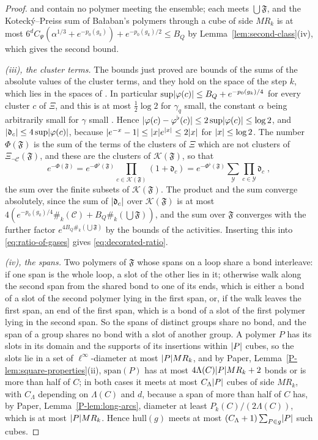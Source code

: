 \documentclass[11pt]{preprint}
\DeclarePairedDelimiter{\abs}{\lvert}{\rvert}
\numberwithin{equation}{section}
\theoremstyle{definition}
\theoremstyle{remark}
\theoremstyle{plain}
\begin{document}
\begin{proof}
and contain no polymer meeting the ensemble; each meets $\bigcup\mathfrak F$, and the Koteck\'y--Preiss sum of Ba{\l}aban's polymers through a cube of side $MR_k$ is at most $6^dC_\Psi(\alpha^{1/3} + e^{-p_0(g_k)}) + e^{-p_0(g_k)/2} \leq B_Q$ by Lemma~\ref{lem:second-class}(iv), which gives the second bound.

\emph{(iii), the cluster terms.} The bounds just proved are bounds of the sums of the absolute values of the cluster terms, and they hold on the space of the step $k$, which lies in the spaces of \cite[(1.73)--(1.75), p.~380]{BalabanLFR2}. In particular $\sup\abs{\varphi(c)} \leq B_Q + e^{-p_0(g_k)/4}$ for every cluster $c$ of $\Xi$, and this is at most $\frac12\log 2$ for $\gamma_q$ small, the constant $\alpha$ being arbitrarily small for $\gamma$ small \cite[p.~377]{BalabanLFR2}. Hence $\abs{\varphi(c) - \varphi^\flat(c)} \leq 2\sup\abs{\varphi(c)} \leq \log 2$, and $\abs{\mathfrak d_c} \leq 4\sup\abs{\varphi(c)}$, because $\abs{e^{-x} - 1} \leq \abs xe^{\abs x} \leq 2\abs x$ for $\abs x \leq \log 2$. The number $\Phi(\mathfrak F)$ is the sum of the terms of the clusters of $\Xi$ which are not clusters of $\Xi_{\neg\mathcal C}(\mathfrak F)$, and these are the clusters of $\mathcal K(\mathfrak F)$, so that
\[
    e^{-\Phi(\mathfrak F)} = e^{-\Phi^\flat(\mathfrak F)}\prod_{c \in \mathcal K(\mathfrak F)}(1 + \mathfrak d_c) = e^{-\Phi^\flat(\mathfrak F)}\sum_{\mathcal Y}\prod_{c \in \mathcal Y}\mathfrak d_c\;,
\]
the sum over the finite subsets of $\mathcal K(\mathfrak F)$. The product and the sum converge absolutely, since the sum of $\abs{\mathfrak d_c}$ over $\mathcal K(\mathfrak F)$ is at most $4(e^{-p_0(g_k)/4}\#_k(\mathcal C) + B_Q\#_k(\bigcup\mathfrak F))$, and the sum over $\mathfrak F$ converges with the further factor $e^{4B_Q\#_k(\bigcup\mathfrak F)}$ by the bounds of the activities. Inserting this into \eqref{eq:ratio-of-gases} gives \eqref{eq:decorated-ratio}.

\emph{(iv), the spans.} Two polymers of $\mathfrak F$ whose spans on a loop share a bond interleave: if one span is the whole loop, a slot of the other lies in it; otherwise walk along the second span from the shared bond to one of its ends, which is either a bond of a slot of the second polymer lying in the first span, or, if the walk leaves the first span, an end of the first span, which is a bond of a slot of the first polymer lying in the second span. So the spans of distinct groups share no bond, and the span of a group shares no bond with a slot of another group. A polymer $P$ has its slots in its domain and the supports of its insertions within $\abs P$ cubes, so the slots lie in a set of $\ell^\infty$-diameter at most $\abs PMR_k$, and by Paper, Lemma~\ref{P-lem:square-properties}(ii), $\mathrm{span}(P)$ has at most $4\Lambda(C)\abs PMR_k + 2$ bonds or is more than half of $C$; in both cases it meets at most $C_\Lambda\abs P$ cubes of side $MR_k$, with $C_\Lambda$ depending on $\Lambda(C)$ and $d$, because a span of more than half of $C$ has, by Paper, Lemma~\ref{P-lem:long-arcs}, diameter at least $P_k(C)/(2\Lambda(C))$, which is at most $\abs PMR_k$. Hence $\mathrm{hull}(g)$ meets at most $(C_\Lambda + 1)\sum_{P \in g}\abs P$ such cubes.


\end{proof}
\end{document}
